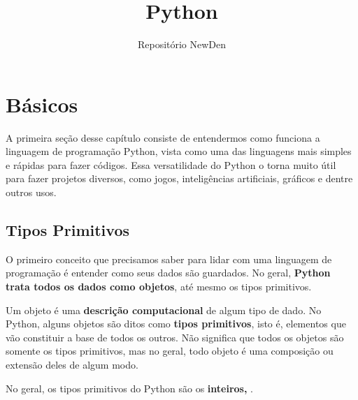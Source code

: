 \documentclass[11pt, a4paper]{article}
\title{Python}
\author{Repositório NewDen}
\date{}
\begin{document}
\maketitle
\void[-3]

\lin
\void[-1]
\tableofcontents
\lin
\newpage

\section{Básicos}

A primeira seção desse capítulo consiste de entendermos como funciona a linguagem de programação Python, vista como uma das linguagens mais simples e rápidas para fazer códigos. Essa versatilidade do Python o torna muito útil para fazer projetos diversos, como jogos, inteligências artificiais, gráficos e dentre outros usos.

\subsection{Tipos Primitivos}

O primeiro conceito que precisamos saber para lidar com uma linguagem de programação é entender como seus dados são guardados. No geral, \textbf{Python trata todos os dados como objetos}, até mesmo os tipos primitivos.

Um objeto é uma \textbf{descrição computacional} de algum tipo de dado. No Python, alguns objetos são ditos como \textbf{tipos primitivos}, isto é, elementos que vão constituir a base de todos os outros. Não significa que todos os objetos são somente os tipos primitivos, mas no geral, todo objeto é uma composição ou extensão deles de algum modo.

No geral, os tipos primitivos do Python são os \textbf{inteiros, }.
\end{document}
